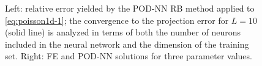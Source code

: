 \documentclass[12pt, a4paper, twoside, openright, notitlepage]{report}
\numberwithin{equation}{chapter}
\theoremstyle{theorem}
\theoremstyle{definition}
\theoremstyle{remark}
\theoremstyle{proposition}
\numberwithin{figure}{chapter}
\begin{document}
\begin{figure}[t!]
			
			\caption{Left: relative error yielded by the POD-NN RB method applied to \eqref{eq:poisson1d-1}; the convergence to the projection error for $L = 10$ (solid line) is analyzed in terms of both the number of neurons included in the neural network and the dimension of the training set. Right: FE and POD-NN solutions for three parameter values.}
			\label{fig:poisson1d-1-fig3}
		\end{figure}
		
\end{document}
